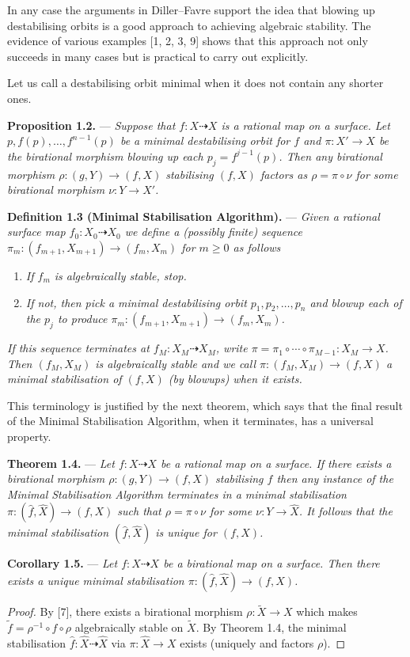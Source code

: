 \documentclass[11pt]{article}
\newcommand{\rat}{\dashrightarrow}
\newcommand{\sourceheading}[1]{\par\medskip\noindent\textbf{#1.} --- }
\newcommand{\sourcestatement}[2]{\par\medskip\noindent\textbf{#1.} --- \textit{#2}\par}
\begin{document}
In any case the arguments in Diller--Favre support the idea that blowing
up destabilising orbits is a good approach to achieving algebraic stability.
The evidence of various examples [1, 2, 3, 9] shows that this approach not
only succeeds in many cases but is practical to carry out explicitly.

Let us call a destabilising orbit minimal when it does not contain any
shorter ones.

\sourcestatement{Proposition 1.2}{Suppose that $f:X\rat X$ is a rational
map on a surface. Let $p,f(p),\ldots,f^{n-1}(p)$ be a minimal destabilising
orbit for $f$ and $\pi:X'\to X$ be the birational morphism blowing up each
$p_j=f^{j-1}(p)$. Then any birational morphism $\rho:(g,Y)\to(f,X)$
stabilising $(f,X)$ factors as $\rho=\pi\circ\nu$ for some birational
morphism $\nu:Y\to X'$.}

\sourceheading{Definition 1.3 (Minimal Stabilisation Algorithm)}
\textit{Given a rational surface map $f_0:X_0\rat X_0$ we define a
(possibly finite) sequence
$\pi_m:(f_{m+1},X_{m+1})\to(f_m,X_m)$ for $m\geq0$ as follows}
\begin{enumerate}
 \item \textit{If $f_m$ is algebraically stable, stop.}
 \item \textit{If not, then pick a minimal destabilising orbit
 $p_1,p_2,\ldots,p_n$ and blowup each of the $p_j$ to produce
 $\pi_m:(f_{m+1},X_{m+1})\to(f_m,X_m)$.}
\end{enumerate}
\textit{If this sequence terminates at $f_M:X_M\rat X_M$, write
$\pi=\pi_1\circ\cdots\circ\pi_{M-1}:X_M\to X$. Then $(f_M,X_M)$ is
algebraically stable and we call $\pi:(f_M,X_M)\to(f,X)$ a minimal
stabilisation of $(f,X)$ (by blowups) when it exists.}

This terminology is justified by the next theorem, which says that the
final result of the Minimal Stabilisation Algorithm, when it terminates,
has a universal property.

\sourcestatement{Theorem 1.4}{Let $f:X\rat X$ be a rational map on a
surface. If there exists a birational morphism $\rho:(g,Y)\to(f,X)$
stabilising $f$ then any instance of the Minimal Stabilisation Algorithm
terminates in a minimal stabilisation
$\pi:(\widehat f,\widehat X)\to(f,X)$ such that $\rho=\pi\circ\nu$ for
some $\nu:Y\to\widehat X$. It follows that the minimal stabilisation
$(\widehat f,\widehat X)$ is unique for $(f,X)$.}

\sourcestatement{Corollary 1.5}{Let $f:X\rat X$ be a birational map on
a surface. Then there exists a unique minimal stabilisation
$\pi:(\widehat f,\widehat X)\to(f,X)$.}
\begin{proof}
By [7], there exists a birational morphism $\rho:\widetilde X\to X$ which
makes $\widetilde f=\rho^{-1}\circ f\circ\rho$ algebraically stable on
$\widetilde X$. By Theorem 1.4, the minimal stabilisation
$\widehat f:\widehat X\rat\widehat X$ via $\pi:\widehat X\to X$ exists
(uniquely and factors $\rho$).
\end{proof}
\end{document}

